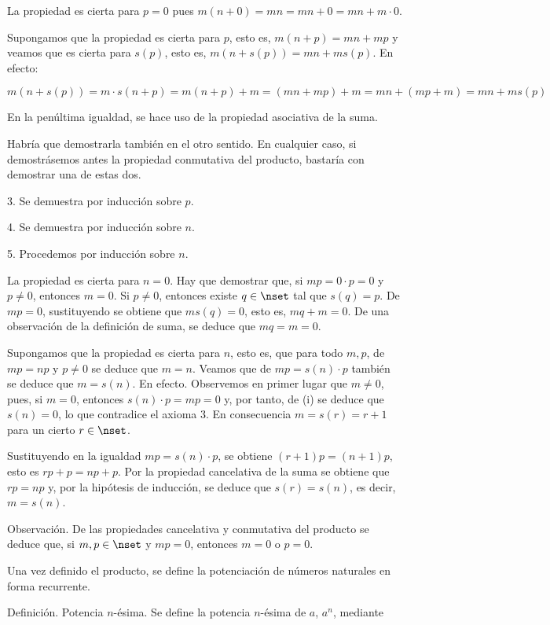 La propiedad es cierta para $p = 0$ pues $m(n + 0) = mn = mn + 0 = mn + m
\cdot 0$.

Supongamos que la propiedad es cierta para $p$, esto es, $m(n + p) = mn +
mp$ y veamos que es cierta para $s(p)$, esto es, $m(n + s(p)) = mn + ms(p)$.
En efecto:

$$ m(n + s(p)) = m \cdot s(n + p) = m(n + p) + m = (mn + mp) + m = mn + (mp
+ m) = mn + ms(p) $$

\noindent En la penúltima igualdad, se hace uso de la propiedad asociativa
de la suma.

Habría que demostrarla también en el otro sentido. En cualquier
caso, si demostrásemos antes la propiedad conmutativa del producto, bastaría
con demostrar una de estas dos.

3. Se demuestra por inducción sobre $p$.

4. Se demuestra por inducción sobre $n$.

5. Procedemos por inducción sobre $n$.

La propiedad es cierta para $n = 0$. Hay que demostrar que, si $mp = 0 \cdot
p = 0$ y $p \neq 0$, entonces $m = 0$. Si $p \neq 0$, entonces existe $q \in
\nset$ tal que $s(q) = p$. De $mp = 0$, sustituyendo se obtiene que $ms(q) =
0$, esto es, $mq + m = 0$. De una observación de la definición de suma, se
deduce que $mq = m = 0$.

Supongamos que la propiedad es cierta para $n$, esto es, que para todo $m,
p$, de $mp = np$ y $p \neq 0$ se deduce que $m = n$. Veamos que de $mp =
s(n) \cdot p$ también se deduce que $m = s(n)$. En efecto. Observemos en
primer lugar que $m \neq 0$, pues, si $m = 0$, entonces $s(n) \cdot p = mp =
0$ y, por tanto, de (i) se deduce que $s(n) = 0$, lo que contradice el
axioma 3. En consecuencia $m = s(r) = r + 1$ para un cierto $r \in \nset$.

Sustituyendo en la igualdad $mp = s(n) \cdot p$, se obtiene $(r + 1)p = (n +
1)p$, esto es $rp + p = np + p$. Por la propiedad cancelativa de la suma se
obtiene que $rp = np$ y, por la hipótesis de inducción, se deduce que $s(r)
= s(n)$, es decir, $m = s(n)$.

Observación. De las propiedades cancelativa y conmutativa del producto se
deduce que, si $m, p \in \nset$ y $mp = 0$, entonces $m = 0$ o $p = 0$.

Una vez definido el producto, se define la potenciación de números naturales
en forma recurrente.

Definición. Potencia $n$-ésima. Se define la potencia $n$-ésima de $a$,
$a^n$, mediante

